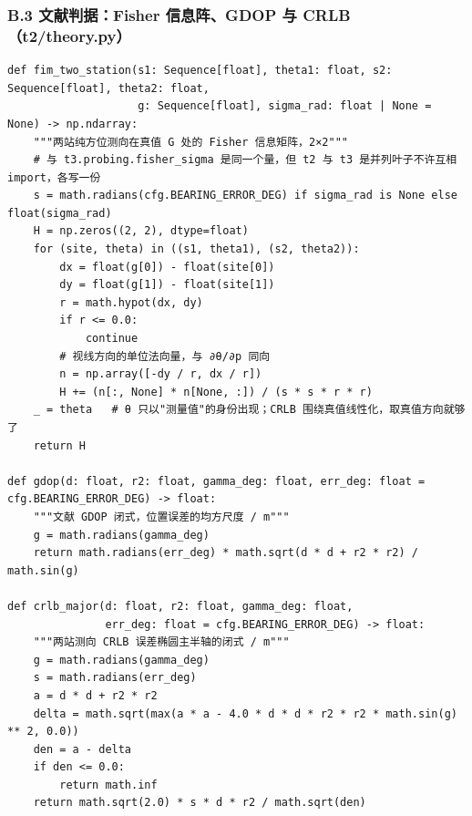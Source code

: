 \documentclass[UTF8, zihao=5,AutoFakeBold=2]{ctexart}
\begin{document}
	\subsubsection*{B.3 \quad 文献判据：Fisher 信息阵、GDOP 与 CRLB（t2/theory.py）}
	\begin{lstlisting}
def fim_two_station(s1: Sequence[float], theta1: float, s2: Sequence[float], theta2: float,
                    g: Sequence[float], sigma_rad: float | None = None) -> np.ndarray:
    """两站纯方位测向在真值 G 处的 Fisher 信息矩阵，2×2"""
    # 与 t3.probing.fisher_sigma 是同一个量，但 t2 与 t3 是并列叶子不许互相 import，各写一份
    s = math.radians(cfg.BEARING_ERROR_DEG) if sigma_rad is None else float(sigma_rad)
    H = np.zeros((2, 2), dtype=float)
    for (site, theta) in ((s1, theta1), (s2, theta2)):
        dx = float(g[0]) - float(site[0])
        dy = float(g[1]) - float(site[1])
        r = math.hypot(dx, dy)
        if r <= 0.0:
            continue
        # 视线方向的单位法向量，与 ∂θ/∂p 同向
        n = np.array([-dy / r, dx / r])
        H += (n[:, None] * n[None, :]) / (s * s * r * r)
    _ = theta   # θ 只以"测量值"的身份出现；CRLB 围绕真值线性化，取真值方向就够了
    return H

def gdop(d: float, r2: float, gamma_deg: float, err_deg: float = cfg.BEARING_ERROR_DEG) -> float:
    """文献 GDOP 闭式，位置误差的均方尺度 / m"""
    g = math.radians(gamma_deg)
    return math.radians(err_deg) * math.sqrt(d * d + r2 * r2) / math.sin(g)

def crlb_major(d: float, r2: float, gamma_deg: float,
               err_deg: float = cfg.BEARING_ERROR_DEG) -> float:
    """两站测向 CRLB 误差椭圆主半轴的闭式 / m"""
    g = math.radians(gamma_deg)
    s = math.radians(err_deg)
    a = d * d + r2 * r2
    delta = math.sqrt(max(a * a - 4.0 * d * d * r2 * r2 * math.sin(g) ** 2, 0.0))
    den = a - delta
    if den <= 0.0:
        return math.inf
    return math.sqrt(2.0) * s * d * r2 / math.sqrt(den)
	\end{lstlisting}
\end{document}
